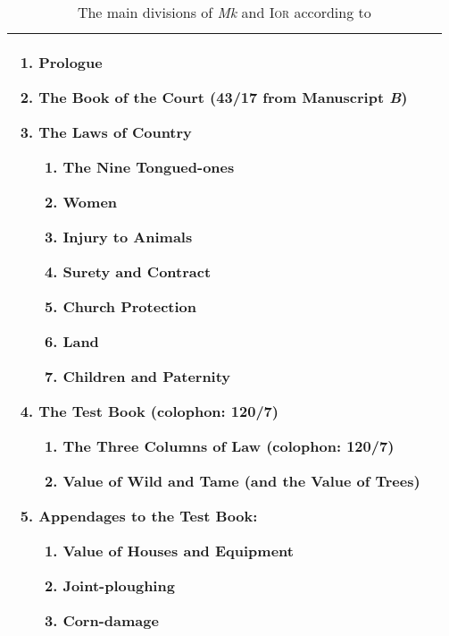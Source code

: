 \begin{table}[h]
\begin{tabular}{@{}p{}p{}@{}}
\begin{enumerate}
\item Prologue
\item The Book of the Court (43/17 from Manuscript \textit{B})
\item The Laws of Country
  \begin{enumerate}
  \item The Nine Tongued-ones
  \item Women
  \item Injury to Animals
  \item Surety and Contract
  \item Church Protection
  \item Land
  \item Children and Paternity
  \end{enumerate}
\item The Test Book (colophon: 120/7)
  \begin{enumerate}
  \item The Three Columns of Law (colophon: 120/7)
  \item Value of Wild and Tame (and the Value of Trees)
  \end{enumerate}
\item Appendages to the Test Book:
  \begin{enumerate}
  \item Value of Houses and Equipment
  \item Joint-ploughing
  \item Corn-damage
  \end{enumerate}
\end{enumerate}\\\bottomrule
\end{tabular}
\caption{The main divisions of \textit{Mk} and \textsc{Ior} according to \textcite[27--28]{charles-edwards_welsh_1989}}
\label{tab:divisions}
\end{table}


